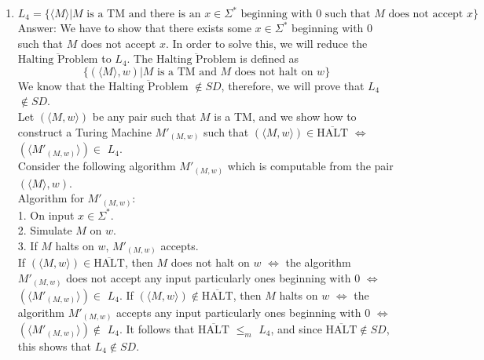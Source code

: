 \documentclass{csc_assignment}
\begin{document}
\begin{description}
\begin{enumerate}
  \item $L_4 = \{\langle{M}\rangle | M \text{ is a TM and there is an } x \in \Sigma^* \text{ beginning with } 0 \text{ such that } M \text{ does not accept }x\}$ \\
  Answer:  We have to show that there exists some $x \in \Sigma^{*}$ beginning with 0 such that $M$ does not accept $x$. In order to solve this, we will reduce the $\overline{\text{Halting Problem}}$ to $L_{4}$. The $\overline{\text{Halting Problem}}$ is defined as $$\{(\langle M \rangle, w) | M \text{ is a TM and } M \text{ does not halt on } w\}$$ We know that the $\overline{\text{Halting Problem}}$ $\notin SD$, therefore, we will prove that $L_{4}$ $\notin SD$. \\ Let $(\langle M, w \rangle)$ be any pair such that $M$ is a TM, and we show how to construct a Turing Machine $M'_{(M,w)}$ such that $(\langle M, w \rangle) \in \overline{\text{HALT}}$ $\Leftrightarrow$ $(\langle M'_{(M,w)}\rangle) \in$ $L_{4}$. \\ Consider the following algorithm $M'_{(M,w)}$ which is computable from the pair $(\langle M \rangle, w)$.\\ Algorithm for $M'_{(M,w)}$: \\ 1. On input $x \in \Sigma^{*}$. \\ 2. Simulate $M$ on $w$. \\ 3. If $M$ halts on $w$, $M'_{(M,w)}$ accepts.  \\ If $(\langle M, w \rangle) \in \overline{\text{HALT}}$, then $M$ does not halt on $w$ $\Leftrightarrow$ the algorithm $M'_{(M,w)}$ does not accept any input particularly ones beginning with $0$  $\Leftrightarrow$ $(\langle M'_{(M,w)}\rangle) \in$ $L_{4}$. If $(\langle M, w \rangle) \notin \overline{\text{HALT}}$, then $M$ halts on $w$ $\Leftrightarrow$ the algorithm $M'_{(M,w)}$ accepts any input particularly ones beginning with $0$  $\Leftrightarrow$ $(\langle M'_{(M,w)}\rangle) \notin$ $L_{4}$. It follows that $\overline{\text{HALT}}$ $\leq_{m}$ $L_{4}$, and since $\overline{\text{HALT}}\notin SD$, this shows that $L_{4} \notin SD$.\\[3pt]                        

\end{enumerate}
\end{description}
\end{document}
